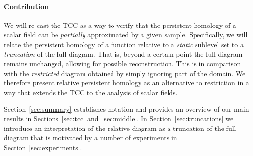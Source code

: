 
\paragraph*{Contribution}

We will re-cast the TCC as a way to verify that the persistent homology of a scalar field can be \emph{partially} approximated by a given sample.
Specifically, we will relate the persistent homology of a function relative to a \emph{static} sublevel set to a \emph{truncation} of the full diagram.
That is, beyond a certain point the full diagram remains unchanged, allowing for possible reconstruction.
This is in comparison with the \emph{restricted} diagram obtained by simply ignoring part of the domain.
We therefore present relative persistent homology as an alternative to restriction in a way that extends the TCC to the analysis of scalar fields.

Section~\ref{sec:summary} establishes notation and provides an overview of our main results in Sections~\ref{sec:tcc} and~\ref{sec:middle}.
In Section~\ref{sec:truncations} we introduce an interpretation of the relative diagram as a truncation of the full diagram that is motivated by a number of experiments in Section~\ref{sec:experiments}.%


